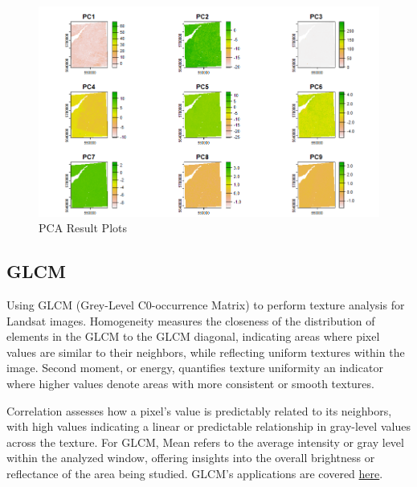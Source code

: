 \documentclass[
  letterpaper,
  DIV=11,
  numbers=noendperiod]{scrreprt}
\begin{document}
\begin{figure}

{\centering \includegraphics[width=6.75in,height=\textheight]{images/wk3/wk3_1st_pca_plot.png}

}

\caption{PCA Result Plots}

\end{figure}

\hypertarget{glcm}{%
\subsection*{GLCM}\label{glcm}}

Using GLCM (Grey-Level C0-occurrence Matrix) to perform texture analysis
for Landsat images. Homogeneity measures the closeness of the
distribution of elements in the GLCM to the GLCM diagonal, indicating
areas where pixel values are similar to their neighbors, while
reflecting uniform textures within the image. Second moment, or energy,
quantifies texture uniformity an indicator where higher values denote
areas with more consistent or smooth textures.

Correlation assesses how a pixel's value is predictably related to its
neighbors, with high values indicating a linear or predictable
relationship in gray-level values across the texture. For GLCM, Mean
refers to the average intensity or gray level within the analyzed
window, offering insights into the overall brightness or reflectance of
the area being studied. GLCM's applications are covered
\protect\hyperlink{week-6-introduction-to-google-earth-engine}{here}.
\end{document}

